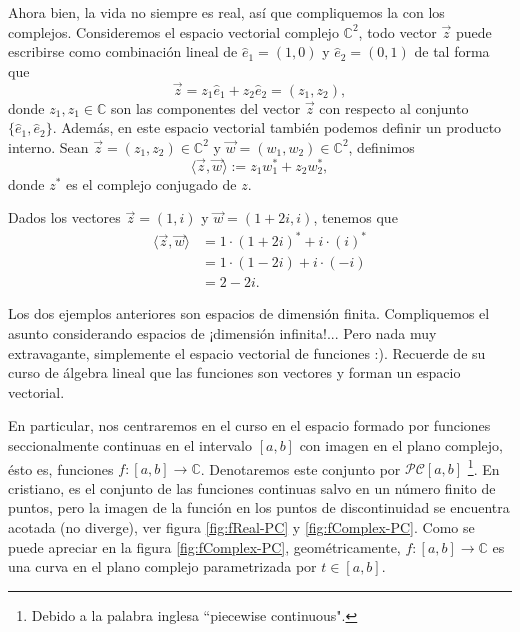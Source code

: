 Ahora bien, la vida no siempre es real, así que compliquemos la con los complejos. Consideremos el espacio vectorial complejo $\mathbb{C}^2$, todo vector $\vec{z}$ puede escribirse como combinación lineal de $\hat{e}_{1} = (1,0)$ y $\hat{e}_2 = (0,1)$ de tal forma que
\begin{equation}
    \vec{z} = z_{1} \hat{e}_{1} + z_{2} \hat{e}_{2} = (z_1,z_2),
\end{equation}
donde $z_{1}, z_{1} \in \mathbb{C}$ son las componentes del vector $\vec{z}$ con respecto al conjunto $\{\hat{e}_1,\hat{e}_2\}$. Además, en este espacio vectorial también podemos definir un producto interno. Sean $\vec{z} = (z_1,z_2) \in \mathbb{C}^2$ y $\vec{w} = (w_1,w_2) \in \mathbb{C}^2$, definimos
\begin{equation}
    \langle \vec{z}, \vec{w} \rangle := z_1 w_1^{*} + z_2 w_2^{*},
\end{equation}
donde $z^*$ es el complejo conjugado de $z$.

\begin{ejemplo}
    Dados los vectores $\vec{z} = (1,i)$ y $\vec{w} = (1 + 2i,i)$, tenemos que
    \begin{align}
      \langle \vec{z}, \vec{w} \rangle &= 1 \cdot (1 + 2i)^* + i \cdot (i)^* \nonumber \\
      &=  1 \cdot (1 - 2i) + i \cdot (-i) \nonumber \\
      &= 2 - 2i. 
    \end{align}
\end{ejemplo}

Los dos ejemplos anteriores son espacios de dimensión finita. Compliquemos el asunto considerando espacios de ¡dimensión infinita!... Pero nada muy extravagante, simplemente el espacio vectorial de funciones :). Recuerde de su curso de álgebra lineal que las funciones son vectores y forman un espacio vectorial. 

En particular, nos centraremos en el curso en el espacio formado por funciones seccionalmente continuas en el intervalo $[a,b]$ con imagen en el plano complejo, ésto es, funciones $f:[a,b] \rightarrow \mathbb{C}$. Denotaremos este conjunto por $\mathcal{PC}[a,b]$ \footnote{Debido a la palabra inglesa ``piecewise continuous".}. En cristiano, es el conjunto de las funciones continuas salvo en un número finito de puntos, pero la imagen de la función en los puntos de discontinuidad se encuentra acotada (no diverge), ver figura \ref{fig:fReal-PC} y \ref{fig:fComplex-PC}. Como se puede apreciar en la figura \ref{fig:fComplex-PC}, geométricamente, $f: [a,b] \longrightarrow \mathbb{C}$ es una curva en el plano complejo parametrizada por $t \in [a,b]$. 

